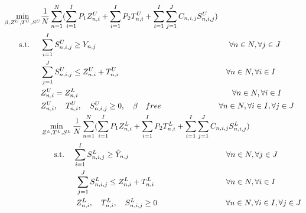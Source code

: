 \documentclass[12pt]{article}
\begin{document}
\begin{subequations}
\begin{flalign}
\min\limits_{\beta,Z^U,T^U,S^U} & \frac{1}{N}\sum\limits_{n=1}^{N}(\sum\limits_{i=1}^{I}P_1Z^U_{n,i}+\sum\limits_{i=1}^{I}P_2T^U_{n,i}+\sum\limits_{i=1}^{I}\sum\limits_{j=1}^{J}C_{n,i,j}S^U_{n,i,j}) \label{eq:eq30}\\
\textrm{s.t.} \hspace{5 mm} & \sum\limits_{i=1}^{I}S^U_{n,i,j}\geq Y_{n,j} \hspace{60 mm} \forall n \in N,\forall j \in J \label{eq:eq31}\\
& \sum\limits_{j=1}^{J}S^U_{n,i,j}\leq Z^U_{n,i}+T^U_{n,i} \hspace{48.5 mm} \forall n \in N,\forall i \in I  \label{eq:eq32}\\
& Z^U_{n,i}= Z^L_{n,i}   \hspace{69.45 mm} \forall n \in N,\forall i \in I \label{eq:eq33}\\
& Z^U_{n,i}, \quad T^U_{n,i}, \quad S^U_{n,i,j}\geq 0,\quad \beta \quad free  \hspace{26 mm} \forall n \in N,\forall i \in I, \forall j \in J \label{eq:e34}\\
&\min\limits_{Z^L,T^L,S^L}  \frac{1}{N}\sum\limits_{n=1}^{N}(\sum\limits_{i=1}^{I}P_1Z^L_{n,i}+\sum\limits_{i=1}^{I}P_2T^L_{n,i}+\sum\limits_{i=1}^{I}\sum\limits_{j=1}^{J}C_{n,i,j}S^L_{n,i,j}) \label{eq:eq35}\\
&\hspace{6 mm} \textrm{s.t.} \hspace{4 mm} \sum\limits_{i=1}^{I}S^L_{n,i,j}\geq \hat{Y}_{n,j}  \hspace{44 mm} \forall n \in N,\forall j \in J \label{eq:eq36}\\
&\hspace{16 mm} \sum\limits_{j=1}^{J}S^L_{n,i,j}\leq Z^L_{n,i}+T^L_{n,i} \hspace{32.5 mm} \forall n \in N,\forall i \in I \label{eq:eq37}\\
&\hspace{16 mm} Z^L_{n,i},\quad T^L_{n,i},\quad S^L_{n,i,j}\geq 0 \hspace{31 mm} \forall n \in N,\forall i \in I, \forall j \in J \label{eq:eq38}
\end{flalign}
\end{subequations}   
\end{document}
